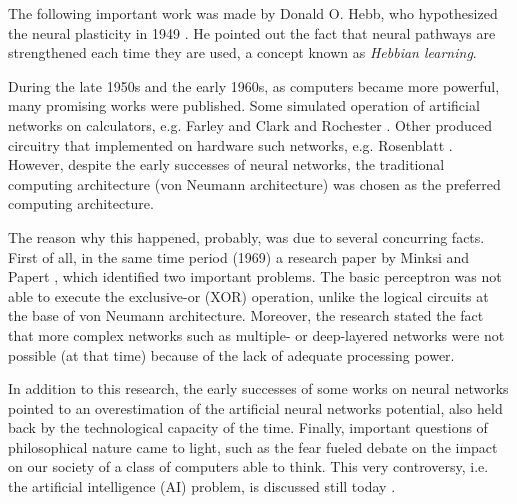 The following important work was made by Donald O. Hebb, who hypothesized the neural plasticity in 1949 \cite{hebb1949organization}.
He pointed out the fact that neural pathways are strengthened each time they are used, a concept known as \textit{Hebbian learning}.

During the late 1950s and the early 1960s, as computers became more powerful, many promising works were published.
Some simulated operation of artificial networks on calculators, e.g. Farley and Clark \cite{Farley1954} and Rochester \cite{Rochester1956}.
Other produced circuitry that implemented on hardware such networks, e.g. Rosenblatt \cite{frank1957perceptron,Rosenblatt1958}.
However, despite the early successes of neural networks, the traditional computing architecture (von Neumann architecture) was chosen as the preferred computing architecture.

The reason why this happened, probably, was due to several concurring facts.
First of all, in the same time period (1969) a research paper by Minksi and Papert \cite{minski1969perceptrons}, which identified two important problems.
The basic perceptron was not able to execute the exclusive-or (XOR) operation, unlike the logical circuits at the base of von Neumann architecture.
Moreover, the research stated the fact that more complex networks such as multiple- or deep-layered networks were not possible (at that time) because of the lack of adequate processing power.


In addition to this research, the early successes of some works on neural networks pointed to an overestimation of the artificial neural networks potential, also held back by the technological capacity of the time.
Finally, important questions of philosophical nature came to light, such as the fear fueled debate on the impact on our society of a class of computers able to think.
This very controversy, i.e. the artificial intelligence (AI) problem, is discussed still today \cite{stanford.edu}.

